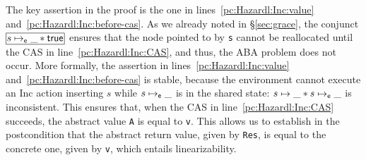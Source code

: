 The key assertion in the proof is the one in lines~\ref{pc:Hazardl:Inc:value}
and~\ref{pc:Hazardl:Inc:before-cas}. As we already noted in \S\ref{sec:grace},
the conjunct $\shareds{s \mapsto_\se \_ * \true}$ ensures that the node pointed
to by {\tt s} cannot be reallocated until the CAS in
line~\ref{pc:Hazardl:Inc:CAS}, and thus, the ABA problem does not occur. More
formally, the assertion in lines~\ref{pc:Hazardl:Inc:value}
and~\ref{pc:Hazardl:Inc:before-cas} is stable, because the environment cannot
execute an {\sf Inc} action inserting $s$ while $s \mapsto_{\sf e} \_$ is in the
shared state: $s \mapsto \_ * s \mapsto_{\sf e} \_$ is inconsistent. This ensures
that, when the CAS in line~\ref{pc:Hazardl:Inc:CAS} succeeds, the abstract value
{\tt A} is equal to {\tt v}. This allows us to establish in the postcondition
that the abstract return value, given by {\tt Res}, is equal to the concrete
one, given by {\tt v}, which entails linearizability.
